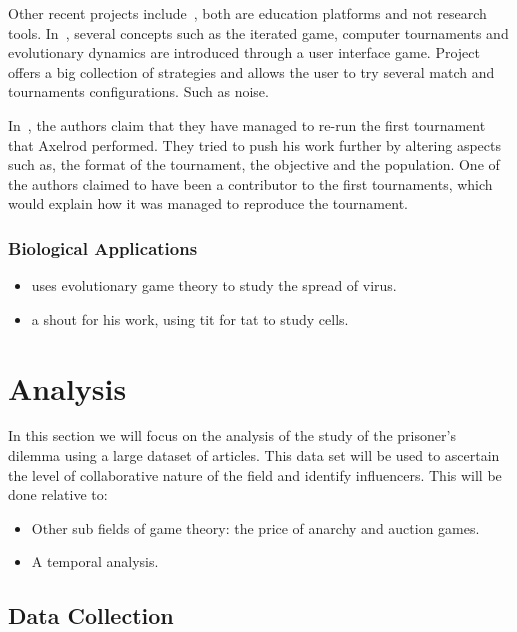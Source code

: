 \documentclass{article}
\begin{document}
Other recent projects include~\cite{pd_trust, pd_game}, both are education 
platforms and not research tools. In~\cite{pd_trust}, several concepts such as 
the iterated game, computer tournaments and evolutionary dynamics are introduced
through a user interface game. Project~\cite{pd_game} offers a big collection of
strategies and allows the user to try several match and tournaments configurations.
Such as noise. 

In~\cite{Rapoport2015}, the authors claim that they have managed to 
re-run the first tournament that Axelrod performed. They tried to push his work
further by altering aspects such as, the format of the tournament, the objective
and the population. One of the authors claimed to have been a contributor
to the first tournaments, which would explain how it was managed to reproduce
the tournament.

\subsubsection{Biological Applications}
\begin{itemize}
    \item \cite{Turner1999} uses evolutionary game theory to study the spread of
    virus.
    \item \cite{Douglas2011} a shout for his work, using tit for tat to study cells.
\end{itemize}

\section{Analysis}\label{section:analysis}

In this section we will focus on the analysis of the study of the prisoner's dilemma
using a large dataset of articles. This data set will be used to ascertain the level
of collaborative nature of the field and identify influencers. This will be done
relative to:

\begin{itemize}
    \item Other sub fields of game theory: the price of anarchy and auction games. %
    \item A temporal analysis.
\end{itemize}

\subsection{Data Collection}
\end{document}
